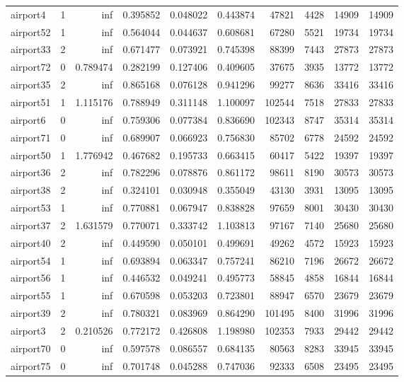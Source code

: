 \begin{longtable}{|l|r|r|r|r|r|r|r|r|r|}
airport4 & 1 & inf & 0.395852 & 0.048022 & 0.443874 & 47821 & 4428 & 14909 & 14909 \\
airport52 & 1 & inf & 0.564044 & 0.044637 & 0.608681 & 67280 & 5521 & 19734 & 19734 \\
airport33 & 2 & inf & 0.671477 & 0.073921 & 0.745398 & 88399 & 7443 & 27873 & 27873 \\
airport72 & 0 & 0.789474 & 0.282199 & 0.127406 & 0.409605 & 37675 & 3935 & 13772 & 13772 \\
airport35 & 2 & inf & 0.865168 & 0.076128 & 0.941296 & 99277 & 8636 & 33416 & 33416 \\
airport51 & 1 & 1.115176 & 0.788949 & 0.311148 & 1.100097 & 102544 & 7518 & 27833 & 27833 \\
airport6 & 0 & inf & 0.759306 & 0.077384 & 0.836690 & 102343 & 8747 & 35314 & 35314 \\
airport71 & 0 & inf & 0.689907 & 0.066923 & 0.756830 & 85702 & 6778 & 24592 & 24592 \\
airport50 & 1 & 1.776942 & 0.467682 & 0.195733 & 0.663415 & 60417 & 5422 & 19397 & 19397 \\
airport36 & 2 & inf & 0.782296 & 0.078876 & 0.861172 & 98611 & 8190 & 30573 & 30573 \\
airport38 & 2 & inf & 0.324101 & 0.030948 & 0.355049 & 43130 & 3931 & 13095 & 13095 \\
airport53 & 1 & inf & 0.770881 & 0.067947 & 0.838828 & 97659 & 8001 & 30430 & 30430 \\
airport37 & 2 & 1.631579 & 0.770071 & 0.333742 & 1.103813 & 97167 & 7140 & 25680 & 25680 \\
airport40 & 2 & inf & 0.449590 & 0.050101 & 0.499691 & 49262 & 4572 & 15923 & 15923 \\
airport54 & 1 & inf & 0.693894 & 0.063347 & 0.757241 & 86210 & 7196 & 26672 & 26672 \\
airport56 & 1 & inf & 0.446532 & 0.049241 & 0.495773 & 58845 & 4858 & 16844 & 16844 \\
airport55 & 1 & inf & 0.670598 & 0.053203 & 0.723801 & 88947 & 6570 & 23679 & 23679 \\
airport39 & 2 & inf & 0.780321 & 0.083969 & 0.864290 & 101495 & 8400 & 31996 & 31996 \\
airport3 & 2 & 0.210526 & 0.772172 & 0.426808 & 1.198980 & 102353 & 7933 & 29442 & 29442 \\
airport70 & 0 & inf & 0.597578 & 0.086557 & 0.684135 & 80563 & 8283 & 33945 & 33945 \\
airport75 & 0 & inf & 0.701748 & 0.045288 & 0.747036 & 92333 & 6508 & 23495 & 23495 \\

\end{longtable}
